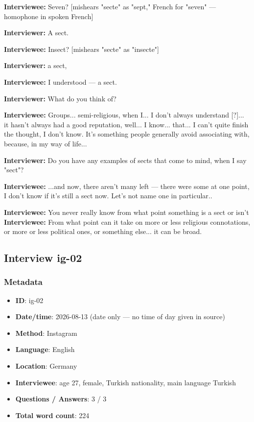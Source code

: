 \textbf{Interviewee:} Seven? [mishears "secte" as "sept," French for "seven" — homophone in spoken French]

\textbf{Interviewer:} A sect.

\textbf{Interviewee:} Insect? [mishears "secte" as "insecte"]

\textbf{Interviewer:} a sect,

\textbf{Interviewee:} I understood — a sect.

\textbf{Interviewer:} What do you think of?

\textbf{Interviewee:} Groups... semi-religious, when I... I don't always understand [?]... it hasn't always had a good reputation, well... I know... that... I can't quite finish the thought, I don't know. It's something people generally avoid associating with, because, in my way of life...

\textbf{Interviewer:} Do you have any examples of sects that come to mind, when I say "sect"?

\textbf{Interviewee:} ...and now, there aren't many left — there were some at one point, I don't know if it's still a sect now. Let's not name one in particular..

\textbf{Interviewee:} You never really know from what point something is a sect or isn't
\textbf{Interviewee:} From what point can it take on more or less religious connotations, or more or less political ones, or something else... it can be broad.

\subsection{Interview ig-02}\label{int:ig-02}
\subsubsection*{Metadata}
\begin{itemize}
  \item \textbf{ID}: ig-02
  \item \textbf{Date/time}: 2026-08-13 (date only — no time of day given in source)
  \item \textbf{Method}: Instagram
  \item \textbf{Language}: English
  \item \textbf{Location}: Germany
  \item \textbf{Interviewee}: age 27, female, Turkish nationality, main language Turkish
  \item \textbf{Questions / Answers}: 3 / 3
  \item \textbf{Total word count}: 224
\end{itemize}
